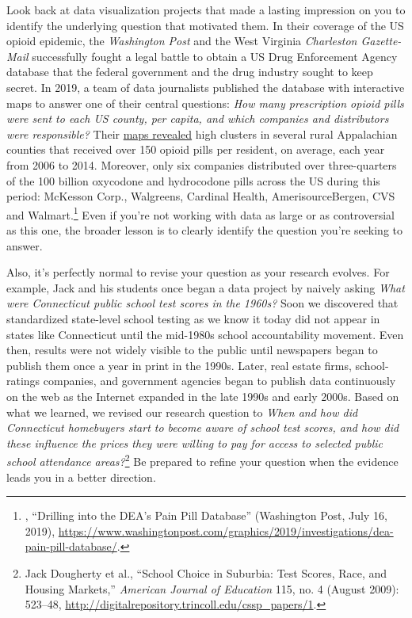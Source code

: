 \documentclass[
  english,
]{book}
\begin{document}
Look back at data visualization projects that made a lasting impression on you to identify the underlying question that motivated them. In their coverage of the US opioid epidemic, the \emph{Washington Post} and the West Virginia \emph{Charleston Gazette-Mail} successfully fought a legal battle to obtain a US Drug Enforcement Agency database that the federal government and the drug industry sought to keep secret. In 2019, a team of data journalists published the database with interactive maps to answer one of their central questions: \emph{How many prescription opioid pills were sent to each US county, per capita, and which companies and distributors were responsible?} Their \href{https://www.washingtonpost.com/graphics/2019/investigations/dea-pain-pill-database/}{maps revealed} high clusters in several rural Appalachian counties that received over 150 opioid pills per resident, on average, each year from 2006 to 2014. Moreover, only six companies distributed over three-quarters of the 100 billion oxycodone and hydrocodone pills across the US during this period: McKesson Corp., Walgreens, Cardinal Health, AmerisourceBergen, CVS and Walmart.\footnote{, {``Drilling into the {DEA}'s {Pain Pill Database}''} ({Washington Post}, July 16, 2019), \url{https://www.washingtonpost.com/graphics/2019/investigations/dea-pain-pill-database/}.} Even if you're not working with data as large or as controversial as this one, the broader lesson is to clearly identify the question you're seeking to answer.

Also, it's perfectly normal to revise your question as your research evolves. For example, Jack and his students once began a data project by naively asking \emph{What were Connecticut public school test scores in the 1960s?} Soon we discovered that standardized state-level school testing as we know it today did not appear in states like Connecticut until the mid-1980s school accountability movement. Even then, results were not widely visible to the public until newspapers began to publish them once a year in print in the 1990s. Later, real estate firms, school-ratings companies, and government agencies began to publish data continuously on the web as the Internet expanded in the late 1990s and early 2000s. Based on what we learned, we revised our research question to \emph{When and how did Connecticut homebuyers start to become aware of school test scores, and how did these influence the prices they were willing to pay for access to selected public school attendance areas?}\footnote{Jack Dougherty et al., {``School {Choice} in {Suburbia}: {Test Scores}, {Race}, and {Housing Markets},''} \emph{American Journal of Education} 115, no. 4 (August 2009): 523--48, \url{http://digitalrepository.trincoll.edu/cssp_papers/1}.} Be prepared to refine your question when the evidence leads you in a better direction.
\end{document}
